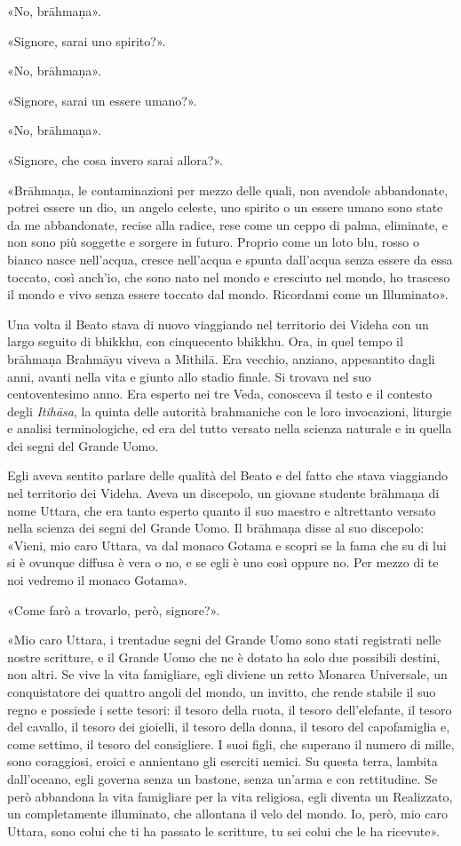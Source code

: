 «No, brāhmaṇa».


«Signore, sarai uno spirito?».


«No, brāhmaṇa».


«Signore, sarai un essere umano?».


«No, brāhmaṇa».


«Signore, che cosa invero sarai allora?».


«Brāhmaṇa, le contaminazioni per mezzo delle quali, non avendole
abbandonate, potrei essere un dio, un angelo celeste, uno spirito o un
essere umano sono state da me abbandonate, recise alla radice, rese come
un ceppo di palma, eliminate, e non sono più soggette e sorgere in
futuro. Proprio come un loto blu, rosso o bianco nasce nell’acqua,
cresce nell’acqua e spunta dall’acqua senza essere da essa toccato, così
anch’io, che sono nato nel mondo e cresciuto nel mondo, ho trasceso il
mondo e vivo senza essere toccato dal mondo. Ricordami come un
Illuminato».




Una volta il Beato stava di nuovo viaggiando nel territorio dei Videha
con un largo seguito di bhikkhu, con cinquecento bhikkhu. Ora, in quel
tempo il brāhmaṇa Brahmāyu viveva a Mithilā. Era vecchio, anziano,
appesantito dagli anni, avanti nella vita e giunto allo stadio finale.
Si trovava nel suo centoventesimo anno. Era esperto nei tre Veda,
conosceva il testo e il contesto degli \emph{Itihāsa}, la quinta delle
autorità brahmaniche con le loro invocazioni, liturgie e analisi
terminologiche, ed era del tutto versato nella scienza naturale e in
quella dei segni del Grande Uomo.


Egli aveva sentito parlare delle qualità del Beato e del fatto che stava
viaggiando nel territorio dei Videha. Aveva un discepolo, un giovane
studente brāhmaṇa di nome Uttara, che era tanto esperto quanto il suo
maestro e altrettanto versato nella scienza dei segni del Grande Uomo.
Il brāhmaṇa disse al suo discepolo: «Vieni, mio caro Uttara, va dal
monaco Gotama e scopri se la fama che su di lui si è ovunque diffusa è
vera o no, e se egli è uno così oppure no. Per mezzo di te noi vedremo
il monaco Gotama».


«Come farò a trovarlo, però, signore?».


«Mio caro Uttara, i trentadue segni del Grande Uomo sono stati
registrati nelle nostre scritture, e il Grande Uomo che ne è dotato ha
solo due possibili destini, non altri. Se vive la vita famigliare, egli
diviene un retto Monarca Universale, un conquistatore dei quattro angoli
del mondo, un invitto, che rende stabile il suo regno e possiede i sette
tesori: il tesoro della ruota, il tesoro dell’elefante, il tesoro del
cavallo, il tesoro dei gioielli, il tesoro della donna, il tesoro del
capofamiglia e, come settimo, il tesoro del consigliere. I suoi figli,
che superano il numero di mille, sono coraggiosi, eroici e annientano
gli eserciti nemici. Su questa terra, lambita dall’oceano, egli governa
senza un bastone, senza un’arma e con rettitudine. Se però abbandona la
vita famigliare per la vita religiosa, egli diventa un Realizzato, un
completamente illuminato, che allontana il velo del mondo. Io, però, mio
caro Uttara, sono colui che ti ha passato le scritture, tu sei colui che
le ha ricevute».


